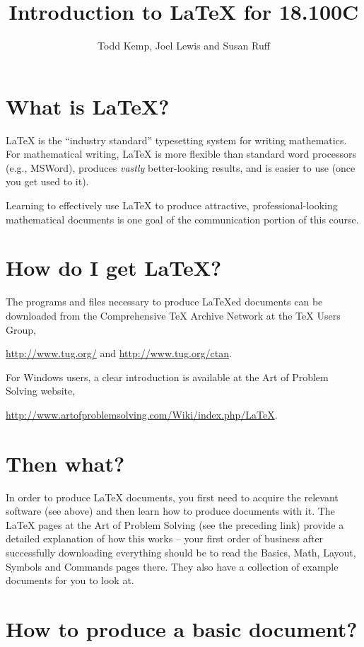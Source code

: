 \documentclass[11pt, notitlepage]{article}
\title{Introduction to LaTeX for 18.100C}
\author{Todd Kemp, Joel Lewis and Susan Ruff}
\begin{document}
\maketitle

\section{What is \LaTeX?}

LaTeX is the ``industry standard'' typesetting system for writing mathematics.  For mathematical writing, LaTeX is more flexible than standard word processors (e.g., MSWord), produces \emph{vastly} better-looking results, and is easier to use (once you get used to it).

Learning to effectively use LaTeX to produce attractive, professional-looking mathematical documents is one goal of the communication portion of this course.

\section{How do I get LaTeX?}

The programs and files necessary to produce LaTeXed documents can be downloaded from the Comprehensive TeX Archive Network at the TeX Users Group, 
\begin{center}
\underline{http://www.tug.org/} and \underline{http://www.tug.org/ctan}.
\end{center}
  For Windows users, a clear introduction is available at the Art of Problem Solving website, 
\begin{center}
\underline{http://www.artofproblemsolving.com/Wiki/index.php/LaTeX}.
\end{center}

\section{Then what?}

In order to produce LaTeX documents, you first need to acquire the relevant software (see above) and then learn how to produce documents with it.  The LaTeX pages at the Art of Problem Solving (see the preceding link) provide a detailed explanation of how this works -- your first order of business after successfully downloading everything should be to read the Basics, Math, Layout, Symbols and Commands pages there.  They also have a collection of example documents for you to look at.

\section{How to produce a basic document?}
\end{document}
